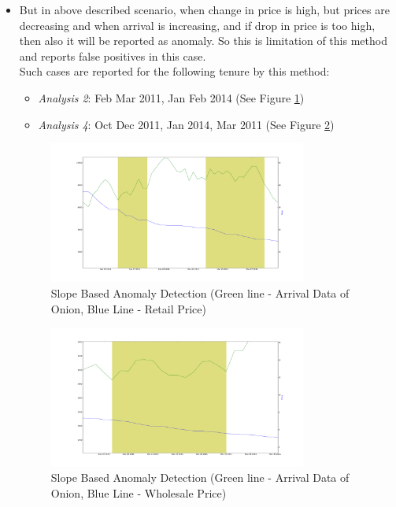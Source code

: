 \documentclass[a4paper,10pt]{report}
\begin{document}
\begin{itemize}
			\item But in above described scenario, when change in price is high, but prices are decreasing and when arrival is increasing, and if drop in price is too high, then also it will be reported as anomaly.	So this is limitation of this method and reports false positives in this case.\\
			Such cases are reported for the following tenure by this method:
			
			\begin{itemize}
				\item \textit{Analysis 2}: Feb Mar 2011, Jan Feb 2014 (See Figure \ref{fig:12122})
				\item \textit{Analysis 4}: Oct Dec 2011, Jan 2014, Mar 2011 (See Figure \ref{fig:12142})
			\end{itemize}
			
			\begin{figure}[H]
		    	\centering
  		    	\includegraphics[width=0.8\textwidth]{graphs/12122.png}
		    	\caption{Slope Based Anomaly Detection (Green line - Arrival Data of Onion, Blue Line - Retail Price)}
		    	\label{fig:12122}
			\end{figure}
			
			\begin{figure}[H]
		    	\centering
  		    	\includegraphics[width=0.8\textwidth]{graphs/12142.png}
		    	\caption{Slope Based Anomaly Detection (Green line - Arrival Data of Onion, Blue Line - Wholesale Price)}
		    	\label{fig:12142}
			\end{figure}
			

\end{itemize}
\end{document}
